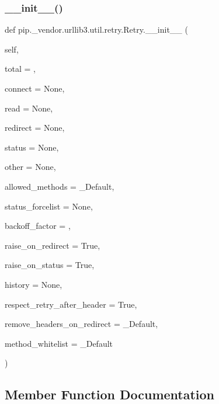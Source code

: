 \subsubsection{\texorpdfstring{\+\_\+\+\_\+init\+\_\+\+\_\+()}{\_\_init\_\_()}}
{\footnotesize\ttfamily def pip.\+\_\+vendor.\+urllib3.\+util.\+retry.\+Retry.\+\_\+\+\_\+init\+\_\+\+\_\+ (\begin{DoxyParamCaption}\item[{}]{self,  }\item[{}]{total = {},  }\item[{}]{connect = {\ttfamily None},  }\item[{}]{read = {\ttfamily None},  }\item[{}]{redirect = {\ttfamily None},  }\item[{}]{status = {\ttfamily None},  }\item[{}]{other = {\ttfamily None},  }\item[{}]{allowed\+\_\+methods = {\ttfamily \+\_\+Default},  }\item[{}]{status\+\_\+forcelist = {\ttfamily None},  }\item[{}]{backoff\+\_\+factor = {},  }\item[{}]{raise\+\_\+on\+\_\+redirect = {\ttfamily True},  }\item[{}]{raise\+\_\+on\+\_\+status = {\ttfamily True},  }\item[{}]{history = {\ttfamily None},  }\item[{}]{respect\+\_\+retry\+\_\+after\+\_\+header = {\ttfamily True},  }\item[{}]{remove\+\_\+headers\+\_\+on\+\_\+redirect = {\ttfamily \+\_\+Default},  }\item[{}]{method\+\_\+whitelist = {\ttfamily \+\_\+Default} }\end{DoxyParamCaption})}



\subsection{Member Function Documentation}
\mbox{\label{classpip_1_1__vendor_1_1urllib3_1_1util_1_1retry_1_1Retry_a028c04e4b9d19918dd5a7d9a5686a647}} 
